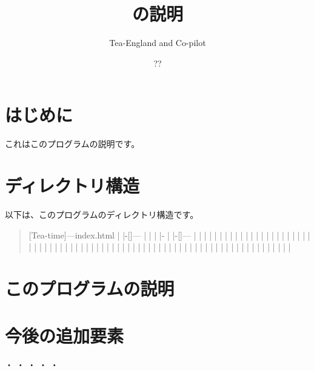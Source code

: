 \documentclass{article}
\title{の説明}
\author{Tea-England and Co-pilot}
\date{??}
\begin{document}
\maketitle

\section{はじめに}
これはこのプログラムの説明です。

\section{ディレクトリ構造}
以下は、このプログラムのディレクトリ構造です。

\begin{verse}
[Tea-time]---{index.html}
           |            
           |-[]---{}               
           |    |             
           |    |-{}               
           |           
           |-[]---{}
           |    |             
           |    |                   
           |    |
           |    |             
           |    |                   
    |    |
    |    |             
    |    |                   
    |    |
    |    |             
    |    |                   
    |    |
    |    |             
    |    |                   
    |    |
    |    |             
    |    |                   
    |    |
    |    |             
    |    |                   
    |    |             
    |    |                   
    |    |
    |    |             
    |    |                        
    |    |                   
    |    |
    |    
    |               
    |             
    |
    |
    |
    |
    |
    |
    |
    |
    |
    |
    |
    |
    |
    |
    |
    |
    |          
                         
                           
                   
                  

\end{verse}
\section{このプログラムの説明}

\section{今後の追加要素}
・
・
・
・
・
\end{document}

